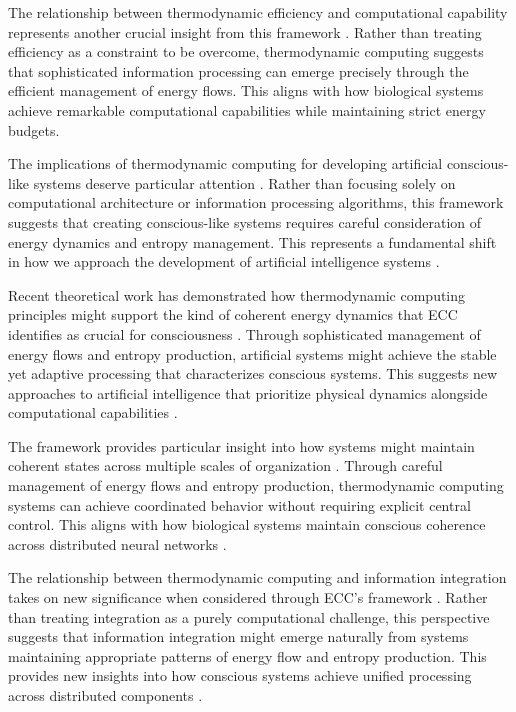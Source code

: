 \begin{refsection}
The relationship between thermodynamic efficiency and computational capability represents another crucial insight from this framework \cite{Perunov2020}. Rather than treating efficiency as a constraint to be overcome, thermodynamic computing suggests that sophisticated information processing can emerge precisely through the efficient management of energy flows. This aligns with how biological systems achieve remarkable computational capabilities while maintaining strict energy budgets.

The implications of thermodynamic computing for developing artificial conscious-like systems deserve particular attention \cite{Sagawa2018}. Rather than focusing solely on computational architecture or information processing algorithms, this framework suggests that creating conscious-like systems requires careful consideration of energy dynamics and entropy management. This represents a fundamental shift in how we approach the development of artificial intelligence systems \cite{Still2020}.

Recent theoretical work has demonstrated how thermodynamic computing principles might support the kind of coherent energy dynamics that ECC identifies as crucial for consciousness \cite{Wolpert2019}. Through sophisticated management of energy flows and entropy production, artificial systems might achieve the stable yet adaptive processing that characterizes conscious systems. This suggests new approaches to artificial intelligence that prioritize physical dynamics alongside computational capabilities \cite{Yoshimura2021}.

The framework provides particular insight into how systems might maintain coherent states across multiple scales of organization \cite{Bennett2019}. Through careful management of energy flows and entropy production, thermodynamic computing systems can achieve coordinated behavior without requiring explicit central control. This aligns with how biological systems maintain conscious coherence across distributed neural networks \cite{Boyd2020}.

The relationship between thermodynamic computing and information integration takes on new significance when considered through ECC's framework \cite{England2018}. Rather than treating integration as a purely computational challenge, this perspective suggests that information integration might emerge naturally from systems maintaining appropriate patterns of energy flow and entropy production. This provides new insights into how conscious systems achieve unified processing across distributed components \cite{Ganesh2021}.


\end{refsection}
